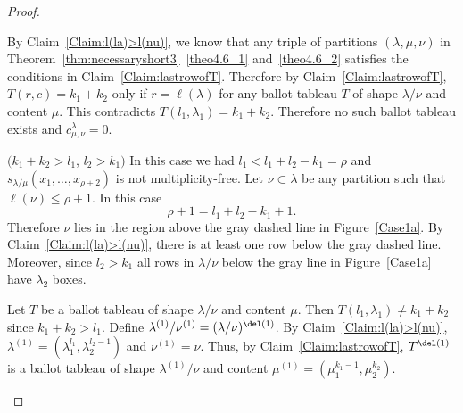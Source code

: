 \begin{proof}
\begin{Case}
By Claim~\ref{Claim:l(la)>l(nu)}, we know that any triple of partitions $(\lambda,\mu,\nu)$ in Theorem~\ref{thm:necessaryshort3}~\ref{theo4.6_1} and~\ref{theo4.6_2} satisfies the conditions in Claim~\ref{Claim:lastrowofT}. Therefore by Claim~\ref{Claim:lastrowofT}, $T(r,c) = k_1+k_2$ only if $r = \ell(\lambda)$ for any ballot tableau $T$ of shape $\lambda/\nu$ and content $\mu$. This contradicts $T(l_1,\lambda_1) = k_1+k_2$. Therefore no such ballot tableau exists and $c^{\lambda}_{\mu,\nu} = 0$.

\end{Case}

\begin{Case}
{ $(k_1+k_2 > l_1$, $l_2>k_1)$} 
In this case we had $l_1<l_1+l_2-k_1=\rho$ and $s_{\lambda/\mu}(x_1,\ldots,x_{\rho+2})$ is not multiplicity-free. Let $\nu\subset \lambda$ be any partition such that $\ell(\nu) \leq \rho+1$. In this case
\begin{equation}
\label{eq:case1.2rho}
\rho+1 = l_1+l_2-k_1 + 1.
\end{equation}
Therefore $\nu$ lies in the region above the gray dashed line in Figure~\ref{Case1a}. By Claim~\ref{Claim:l(la)>l(nu)}, there is at least one row below the gray dashed line. Moreover, since $l_2 > k_1$ all rows in $\lambda/\nu$ below the gray line in Figure~\ref{Case1a} have $\lambda_2$ boxes. 

Let $T$ be a ballot tableau of shape $\lambda/\nu$ and content $\mu$. Then $T(l_1,\lambda_1)\neq k_1+k_2$ since $k_1+k_2 > l_1$. Define $\lambda^{(1)}/ \nu^{(1)} = (\lambda / \nu)^{\del (1)}$. By Claim~\ref{Claim:l(la)>l(nu)}, $\lambda^{(1)} = (\lambda_1^{l_1},\lambda_2^{l_2-1})$ and $\nu^{(1)} = \nu$. Thus, by Claim~\ref{Claim:lastrowofT}, $T^{\del (1)}$ is a ballot tableau of shape $\lambda^{(1)}/\nu$ and content $\mu^{(1)} = (\mu_1^{k_1-1},\mu_2^{k_2})$.



\end{Case}
\end{proof}
